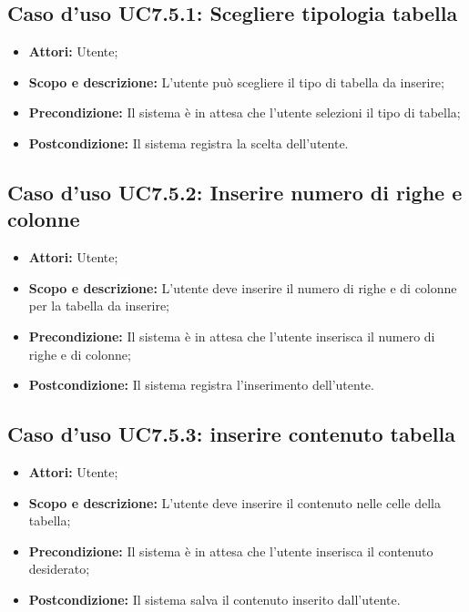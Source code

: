 \subsection{Caso d'uso UC7.5.1: Scegliere tipologia tabella}
\begin{itemize}
	\item \textbf{Attori:} Utente;
	\item \textbf{Scopo e descrizione:} L'utente può scegliere il tipo di tabella da inserire;
	\item \textbf{Precondizione:} Il sistema è in attesa che l'utente selezioni il tipo di tabella;
	\item \textbf{Postcondizione:} Il sistema registra la scelta dell'utente.
\end{itemize}

\subsection{Caso d'uso UC7.5.2: Inserire numero di righe e colonne}
\begin{itemize}
	\item \textbf{Attori:} Utente;
	\item \textbf{Scopo e descrizione:} L'utente deve inserire il numero di righe e di colonne per la tabella da inserire;
	\item \textbf{Precondizione:} Il sistema è in attesa che l'utente inserisca il numero di righe e di colonne;
	\item \textbf{Postcondizione:} Il sistema registra l'inserimento dell'utente.
\end{itemize}

\subsection{Caso d'uso UC7.5.3: inserire contenuto tabella}
\begin{itemize}
	\item \textbf{Attori:} Utente;
	\item \textbf{Scopo e descrizione:} L'utente deve inserire il contenuto nelle celle della tabella;
	\item \textbf{Precondizione:} Il sistema è in attesa che l'utente inserisca il contenuto desiderato;
	\item \textbf{Postcondizione:} Il sistema salva il contenuto inserito dall'utente.
\end{itemize}



